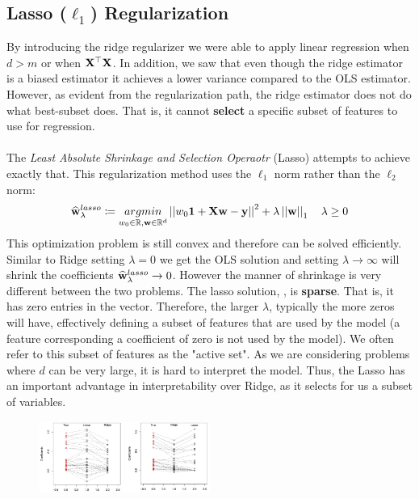 

\subsection{Lasso ($\ell_1$) Regularization}
By introducing the ridge regularizer we were able to apply linear regression when $d>m$ or when $\mathbf{X}^\top\mathbf{X}$. In addition, we saw that even though the ridge estimator is a biased estimator it achieves a lower variance compared to the OLS estimator. However, as evident from the regularization path, the ridge estimator does not do what best-subset does. That is, it cannot \textbf{select} a specific subset of features to use for regression.
\\~\\
The \textit{Least Absolute Shrinkage and Selection Operaotr} (Lasso) attempts to achieve exactly that. This regularization method uses the $\ell_1$ norm rather than the $\ell_2$ norm:
\begin{equation}
\widehat{\mathbf{w}}^{lasso}_{\lambda}\coloneqq\underset{w_0\in\mathbb{R}, \mathbf{w}\in\mathbb{R}^d}{argmin} \left|\left| w_0\mathbf{1} + \mathbf{X}\mathbf{w} - \mathbf{y}\right|\right|^2 + \lambda\left|\left| \mathbf{w}\right|\right|_1\quad \lambda\geq 0
\label{eqn:l1_reg}
\end{equation}
This optimization problem is still convex and therefore can be solved efficiently. Similar to Ridge setting $\lambda=0$ we get the OLS solution and setting $\lambda\rightarrow\infty$ will shrink the coefficients $\widehat{\mathbf{w}}^{lasso}_{\lambda}\rightarrow 0$. However the manner of shrinkage is very different between the two problems. The lasso solution, \lasso, is \textbf{sparse}. That is, it has zero entries in the vector. Therefore, the larger $\lambda$, typically the more zeros \lasso will have, effectively defining a subset of features that are used by the model (a feature corresponding a coefficient of zero is not used by the model). We often refer to this subset of features as the "active set". As we are considering problems where $d$ can be very large, it is hard to interpret the model. Thus, the Lasso has an important advantage in interpretability over Ridge, as it selects for us a subset of variables.

\begin{figure}[!h]
	\centering
	\includegraphics[width=0.5\textwidth]{chapters/regularization.model.selection/figures/coef_ridge_lasso.png}
	\caption{}
\end{figure}

